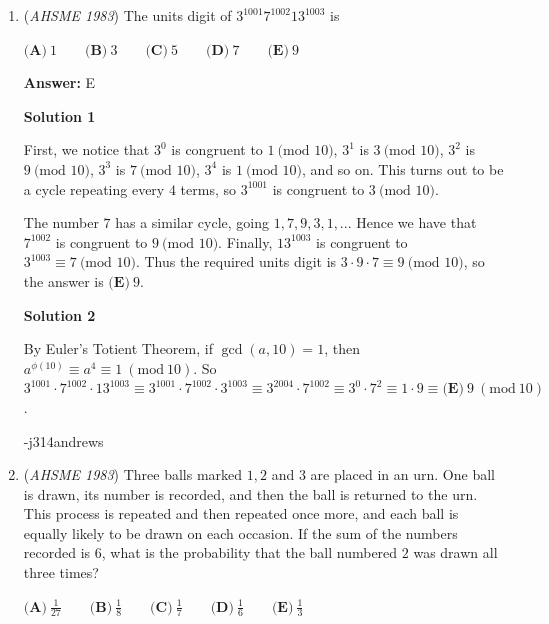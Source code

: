 \begin{enumerate}
 -purplepenguin2

 


	\item (\textit{AHSME 1983}) The units digit of $3^{1001} 7^{1002} 13^{1003}$ is


 $\textbf{(A)}\ 1\qquad \textbf{(B)}\ 3\qquad \textbf{(C)}\ 5\qquad \textbf{(D)}\ 7\qquad \textbf{(E)}\ 9$

 \textbf{Answer: }E



\textbf{Solution 1}

First, we notice that $3^0$ is congruent to $1 \ \text{(mod 10)}$, $3^1$ is $3 \ \text{(mod 10)}$, $3^2$ is $9 \ \text{(mod 10)}$, $3^3$ is $7 \ \text{(mod 10)}$, $3^4$ is $1 \ \text{(mod 10)}$, and so on. This turns out to be a cycle repeating every $4$ terms, so $3^{1001}$ is congruent to $3 \ \text{(mod 10)}$.

 The number $7$ has a similar cycle, going $1, 7, 9, 3, 1, ...$ Hence we have that $7^{1002}$ is congruent to $9 \ \text{(mod 10)}$. Finally, $13^{1003}$ is congruent to $3^{1003} \equiv 7 \ \text{(mod 10)}$. Thus the required units digit is $3\cdot 9\cdot 7 \equiv 9 \ \text{(mod 10)}$, so the answer is $\boxed{\textbf{(E)}\ 9}$.

 



\textbf{Solution 2}

By Euler's Totient Theorem, if $\gcd(a, 10) = 1$, then $a^{\phi(10)} \equiv a^4 \equiv 1\ (\mathrm{mod}\ 10)$.  So $3^{1001} \cdot 7^{1002} \cdot 13^{1003} \equiv 3^{1001} \cdot 7^{1002} \cdot 3^{1003} \equiv 3^{2004} \cdot 7^{1002} \equiv 3^0 \cdot 7^2 \equiv 1 \cdot 9 \equiv \boxed{\textbf{(E)}\ 9}\ (\mathrm{mod}\ 10)$.

 -j314andrews

 


	\item (\textit{AHSME 1983}) Three balls marked $1,2$ and $3$ are placed in an urn. One ball is drawn, its number is recorded, and then the ball is returned to the urn. This process is repeated and then repeated once more, and each ball is equally likely to be drawn on each occasion. If the sum of the numbers recorded is $6$, what is the probability that the ball numbered $2$ was drawn all three times? 


 $\textbf{(A)} \ \frac{1}{27} \qquad  \textbf{(B)} \ \frac{1}{8} \qquad  \textbf{(C)} \ \frac{1}{7} \qquad  \textbf{(D)} \ \frac{1}{6} \qquad \textbf{(E)}\ \frac{1}{3}$


\end{enumerate}
